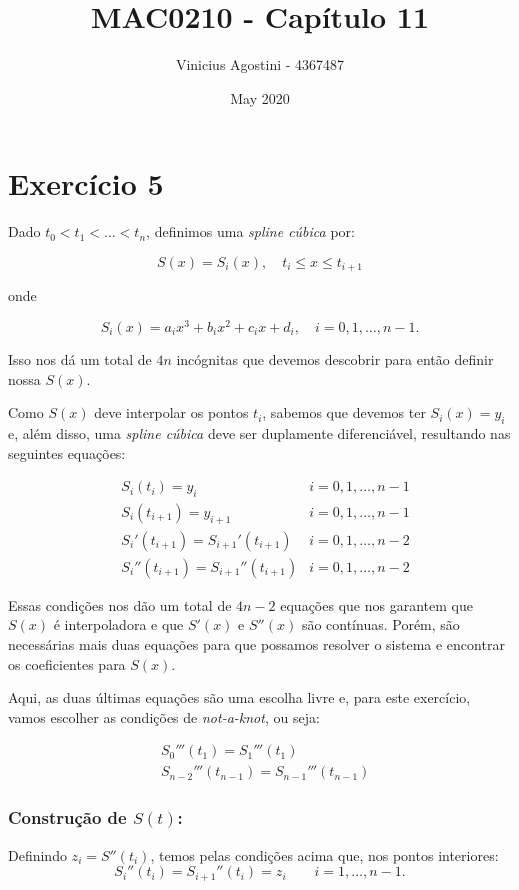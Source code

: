 \documentclass[leqno]{article}
\title{MAC0210 - Capítulo 11}
\author{Vinicius Agostini - 4367487}
\date{May 2020}
\begin{document}
\maketitle

\section*{Exercício 5}

Dado $t_0 < t_1 < \ldots < t_n$, definimos uma \textit{spline cúbica} por:

$$ S(x) = S_i(x),\quad t_i \leq x \leq t_{i+1} $$

onde


$$ S_i(x) = a_ix^3 + b_ix^2 + c_ix + d_i,\quad i = 0, 1, \ldots, n-1. $$

Isso nos dá um total de $4n$ incógnitas que devemos descobrir para então definir
nossa $S(x)$.

Como $S(x)$ deve interpolar os pontos $t_i$, sabemos que devemos ter
$S_i(x) = y_i$ e, além disso, uma \textit{spline cúbica} deve ser duplamente
diferenciável, resultando nas seguintes equações:

\begin{align}
    &S_i(t_i) = y_i                       &i = 0, 1, \ldots, n-1\\
    &S_i(t_{i+1}) = y_{i+1}               &i = 0, 1, \ldots, n-1\\
    &S_i'(t_{i+1}) = S_{i+1}'(t_{i+1})    &i = 0, 1, \ldots, n-2\\
    &S_i''(t_{i+1}) = S_{i+1}''(t_{i+1})  &i = 0, 1, \ldots, n-2
\end{align}

Essas condições nos dão um total de $4n-2$ equações que nos garantem que $S(x)$
é interpoladora e que $S'(x)$ e $S''(x)$ são contínuas. Porém, são necessárias
mais duas equações para que possamos resolver o sistema e encontrar os
coeficientes para $S(x)$.

Aqui, as duas últimas equações são uma escolha livre e, para este exercício,
vamos escolher as condições de \textit{not-a-knot}, ou seja:

\begin{align}
    &S_0'''(t_1) = S_1'''(t_1)\\
    &S_{n-2}'''(t_{n-1}) = S_{n-1}'''(t_{n-1})
\end{align}

\subsubsection*{Construção de $S(t)$:}
Definindo $z_i = S''(t_i)$, temos pelas condições acima que, nos pontos interiores:
        $$ S_i''(t_i) = S_{i+1}''(t_i) = z_i \qquad i = 1, \ldots, n-1. $$
\end{document}
